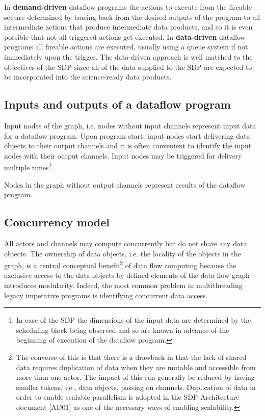 \documentclass[11pt,a4paper]{article}
\begin{document}
In {\bf demand-driven} dataflow programs the actions to execute from
the fireable set are determined by tracing back from the desired
outputs of the program to all intermediate actions that produce
intermediate data products, and so it is even possible that not all
triggered actions get executed. In {\bf data-driven} dataflow programs
all fireable actions are executed, usually using a queue system if not
immediately upon the trigger. The data-driven approach is well matched
to the objectives of the SDP since all of the data supplied to the SDP
are expected to be incorporated into the science-ready data products.


\subsection{Inputs and outputs of a dataflow program}

Input nodes of the graph, i.e. nodes without input channels represent
input data for a dataflow program.  Upon program start, input nodes
start delivering data objects to their output channels and it is often
convenient to identify the input nodes with their output
channels. Input nodes may be triggered for delivery multiple
times\footnote{In case of the SDP the dimensions of the input data are
  determined by the scheduling block being observed and so are known
  in advance of the beginning of execution of the dataflow program.}.

Nodes in the graph without output channels represent results of the dataflow program.

\subsection{Concurrency model}
 
All actors and channels may compute concurrently but do not share any
data objects. The ownership of data objects, i.e. the locality of the
objects in the graph, is a central conceptual benefit\footnote{The
  converse of this is that there is a drawback in that the lack of
  shared data requires duplication of data when they are mutable and
  accessible from more than one actor. The impact of this can
  generally be reduced by having smaller tokens, i.e., data objects,
  passing on channels. Duplication of data in order to enable scalable
  parallelism is adopted in the SDP Architecture document [AD01] as
  one of the necessary ways of enabling scalability.} of data flow
computing because the exclusive access to the data objects by defined
elements of the data flow graph introduces modularity. Indeed, the
most common problem in multithreading legacy imperative programs is
identifying concurrent data access.
\end{document}
